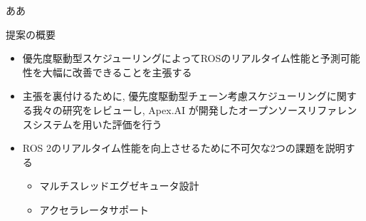 ああ%


\begin{frame}{提案の概要}
    \begin{itemize}
        \item 優先度駆動型スケジューリングによってROSのリアルタイム性能と予測可能性を大幅に改善できることを主張する
        \item 主張を裏付けるために, 優先度駆動型チェーン考慮スケジューリングに関する我々の研究をレビューし, Apex.AI が開発したオープンソースリファレンスシステムを用いた評価を行う
        \item ROS 2のリアルタイム性能を向上させるために不可欠な2つの課題を説明する
        \begin{itemize}
            \item マルチスレッドエグゼキュータ設計
            \item アクセラレータサポート
        \end{itemize}
    \end{itemize}
\end{frame}
